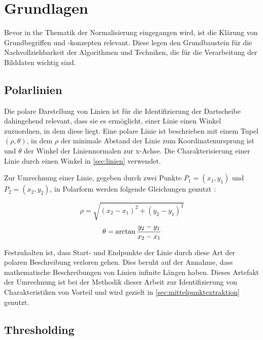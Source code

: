 
\section{Grundlagen}
\label{sec:cv:grundlagen}

Bevor in the Thematik der Normalisierung eingegangen wird, ist die Klärung von Grundbegriffen und -konzepten relevant. Diese legen den Grundbaustein für die Nachvollziehbarkeit der Algorithmen und Techniken, die für die Verarbeitung der Bilddaten wichtig sind.

\subsection{Polarlinien}
\label{sec:polarlinien}

Die polare Darstellung von Linien ist für die Identifizierung der Dartscheibe dahingehend relevant, dass sie es ermöglicht, einer Linie einen Winkel zuzuordnen, in dem diese liegt. Eine polare Linie ist beschrieben mit einem Tupel $(\rho, \theta)$, in dem $\rho$ der minimale Abstand der Linie zum Koordinatenursprung ist und $\theta$ der Winkel der Liniennormalen zur x-Achse. Die Charakterisierung einer Linie durch einen Winkel in \autoref{sec:linien} verwendet.

Zur Umrechnung einer Linie, gegeben durch zwei Punkte $P_1 = (x_1, y_1)$ und $P_2 = (x_2, y_2)$, in Polarform werden folgende Gleichungen genutzt \cite{polar_linien}:

\[ \rho = \sqrt{(x_2 - x_1)^2 + (y_2 - y_1)^2} \]
\[ \theta = \operatorname{arctan} \frac{y_2 - y_1}{x_2 - x_1} \]

Festzuhalten ist, dass Start- und Endpunkte der Linie durch diese Art der polaren Beschreibung verloren gehen. Dies beruht auf der Annahme, dass mathematische Beschreibungen von Linien infinite Längen haben. Dieses Artefakt der Umrechnung ist bei der Methodik dieser Arbeit zur Identifizierung von Charakteristiken von Vorteil und wird gezielt in \autoref{sec:mittelpunktextraktion} genutzt.

\subsection{Thresholding}
\label{sec:thresholding}

